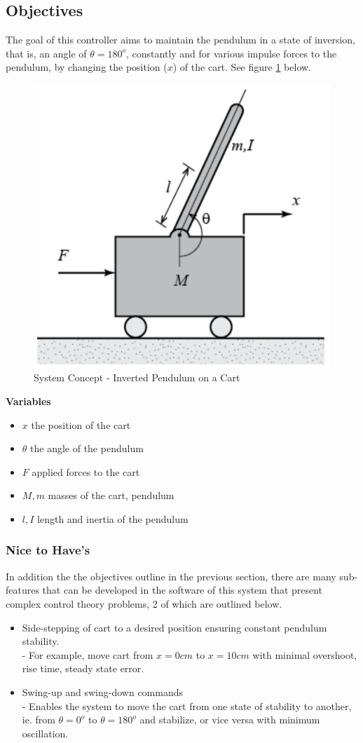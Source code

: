 \documentclass[12pt]{article}
\begin{document}
\subsection{Objectives}
\label{obj}
The goal of this controller aims to maintain the pendulum in a state of inversion, that is, an angle of $\theta = 180^o$, constantly and for various impulse forces to the pendulum, by changing the position ($x$) of the cart. See figure \ref{fig:pend} below.
\begin{figure}[H]
    \centering
    \includegraphics[width=.4\linewidth]{figures/pend.png}
    \caption{System Concept - Inverted Pendulum on a Cart \cite{inv}}
    \label{fig:pend}
\end{figure}

\textbf{Variables}
\begin{itemize}
    \item $x$ the position of the cart
    \item $\theta$ the angle of the pendulum
    \item $F$ applied forces to the cart
    \item $M, m$ masses of the cart, pendulum
    \item $l, I$ length and inertia of the pendulum
\end{itemize}
\subsubsection{Nice to Have's}
\label{nice}
In addition the the objectives outline in the previous section, there are many sub-features that can be developed in the software of this system that present complex control theory problems, 2 of which are outlined below.
\begin{itemize}
    \item Side-stepping of cart to a desired position ensuring constant pendulum stability.\\ \indent - For example, move cart from $x=0cm$ to $x=10cm$ with minimal overshoot, rise time, steady state error.
    \item Swing-up and swing-down commands\\ \indent - Enables the system to move the cart from one state of stability to another, ie. from $\theta =0^o$ to $\theta =180^o$ and stabilize, or vice versa with minimum oscillation.
\end{itemize}
\end{document}

